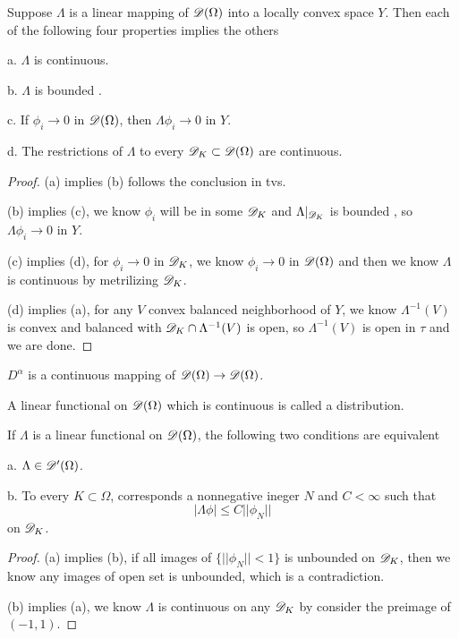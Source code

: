 \begin{theorem}
    Suppose $\Lambda$ is a linear mapping of $\mathscr{D}(\Omega)$ into a locally convex space $Y$. Then each of the following four properties implies the others\par
    a. $\Lambda$ is continuous.\par
    b. $\Lambda$ is bounded .\par
    c. If $\phi_i \to 0$ in $\mathscr{D}(\Omega)$, then $\Lambda \phi_i \to 0$ in $Y$.\par
    d. The restrictions of $\Lambda$ to every $\mathscr{D}_K\subset \mathscr{D}(\Omega)$ are continuous.
\end{theorem}
\begin{proof}
    (a) implies (b) follows the conclusion in tvs.\par
    (b) implies (c), we know $\phi_i$ will be in some $\mathscr{D}_K$ and $\Lambda|_{\mathscr{D}_K}$ is bounded , so $\Lambda \phi_i\to 0$ in $Y$.\par
    (c) implies (d), for $\phi_i \to 0$ in $\mathscr{D}_K$, we know $\phi_i \to 0$ in $\mathscr{D}(\Omega)$ and then we know $\Lambda$ is continuous by metrilizing $\mathscr{D}_K$.\par
    (d) implies (a), for any $V$ convex balanced neighborhood of $Y$, we know $\Lambda^{-1}(V)$ is convex and balanced with $\mathscr{D}_K \cap \Lambda^{-1}(V)$ is open, so $\Lambda^{-1}(V)$ is open in $\tau$ and we are done.
\end{proof}

\begin{corollary}
    $D^{\alpha}$ is a continuous mapping of $\mathscr{D}(\Omega)\to\mathscr{D}(\Omega)$.
\end{corollary}

\begin{definition}
    A linear functional on $\mathscr{D}(\Omega)$ which is continuous is called a distribution.
\end{definition}

\begin{theorem}
    If $\Lambda$ is a linear functional on $\mathscr{D}(\Omega)$, the following two conditions are equivalent\par
    a. $\Lambda \in \mathscr{D}'(\Omega)$.\par
    b. To every $K\subset \Omega$, corresponds a nonnegative ineger $N$ and $C<\infty$ such that
    \[|\Lambda \phi| \leq C||\phi_N||\]
    on $\mathscr{D}_K$.
\end{theorem}
\begin{proof}
    (a) implies (b), if all images of $\{||\phi_N|| < 1\}$ is unbounded on $\mathscr{D}_K$, then we know any images of open set is unbounded, which is a contradiction.\par
    (b) implies (a), we know $\Lambda$ is continuous on any $\mathscr{D}_K$ by consider the preimage of $(-1,1)$.
\end{proof}

